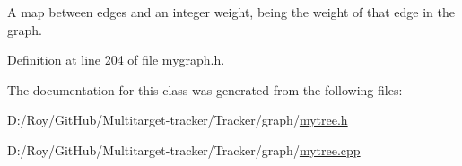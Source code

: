 A map between edges and an integer weight, being the weight of that edge in the graph. 

Definition at line 204 of file mygraph.\+h.



The documentation for this class was generated from the following files\+:\begin{DoxyCompactItemize}
\item 
D\+:/\+Roy/\+Git\+Hub/\+Multitarget-\/tracker/\+Tracker/graph/\mbox{\hyperlink{mytree_8h}{mytree.\+h}}\item 
D\+:/\+Roy/\+Git\+Hub/\+Multitarget-\/tracker/\+Tracker/graph/\mbox{\hyperlink{mytree_8cpp}{mytree.\+cpp}}\end{DoxyCompactItemize}
